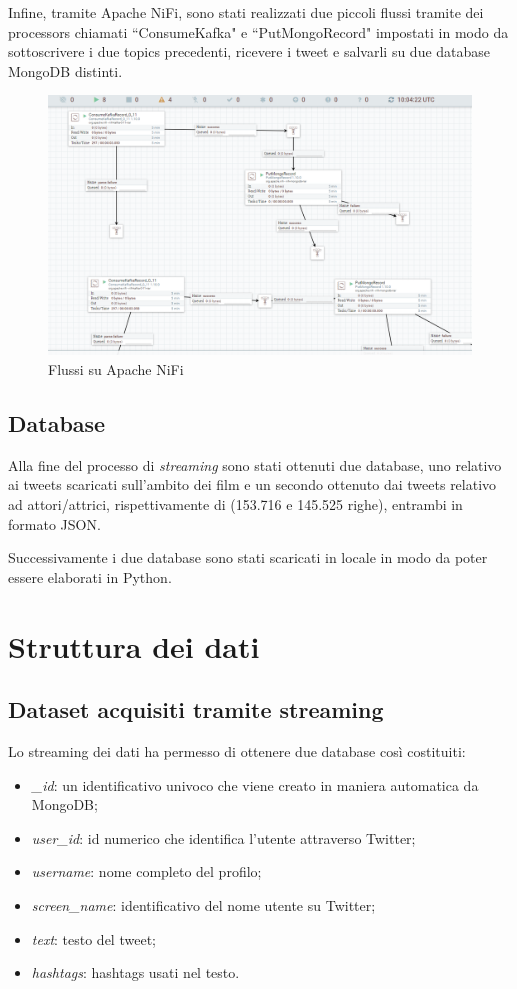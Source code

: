 \documentclass[11pt,a4paper]{report}
\begin{document}
Infine, tramite Apache NiFi, sono stati realizzati due piccoli flussi tramite dei processors chiamati “ConsumeKafka" e “PutMongoRecord" impostati in modo da sottoscrivere i due topics precedenti, ricevere i tweet e salvarli su due database MongoDB distinti.
	\begin{figure}[h]
			\centering
			\includegraphics[width=0.8\linewidth]{imgs/NiFiImmagine.png}
			\caption{Flussi su Apache NiFi}
			\label{fig:Flussi su Apache NiFi}
		\end{figure}
\section{Database}
Alla fine del processo di \textit{streaming} sono stati ottenuti due database, uno relativo ai tweets scaricati sull'ambito dei film e un secondo ottenuto dai tweets relativo ad attori/attrici, rispettivamente di (153.716 e 145.525 righe), entrambi in formato JSON.

Successivamente i due database sono stati scaricati in locale in modo da poter essere elaborati in Python.
\chapter{Struttura dei dati}
\section{Dataset acquisiti tramite streaming}
Lo streaming dei dati ha permesso di ottenere due database così costituiti:
\begin{itemize}
 \item \textit{\_id}: un identificativo univoco che viene creato in maniera automatica da MongoDB;
 \item \textit{user\_id}: id numerico che identifica l'utente attraverso Twitter;
 \item \textit{username}: nome completo del profilo;
 \item \textit{screen\_name}: identificativo del nome utente su Twitter;
\item \textit{text}: testo del tweet;
 \item \textit{hashtags}: hashtags usati nel testo.
\end{itemize}
\end{document}
